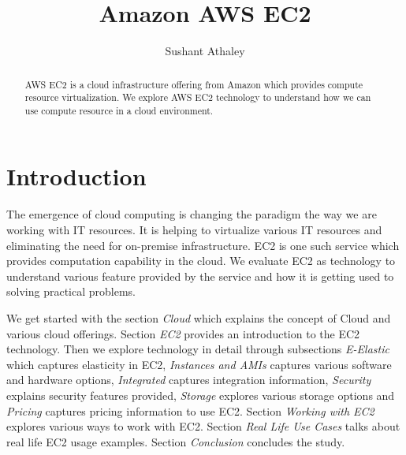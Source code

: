 
\title{Amazon AWS EC2}


\author{Sushant Athaley}

\renewcommand{\shortauthors}{G. v. Laszewski}


\begin{abstract}

AWS EC2 is a cloud infrastructure offering from Amazon which provides
compute resource virtualization. We explore AWS EC2 technology to
understand how we can use compute resource in a cloud environment.

\end{abstract}


\maketitle

\section{Introduction}

The emergence of cloud computing is changing the paradigm the way we
are working with IT resources. It is helping to virtualize various IT
resources and eliminating the need for on-premise infrastructure. EC2
is one such service which provides computation capability in the
cloud. We evaluate EC2 as technology to understand various feature
provided by the service and how it is getting used to solving
practical problems.

We get started with the section \emph{Cloud} which explains the
concept of Cloud and various cloud offerings. Section \emph{EC2}
provides an introduction to the EC2 technology. Then we explore
technology in detail through subsections \emph{E-Elastic} which
captures elasticity in EC2, \emph{Instances and AMIs} captures various
software and hardware options, \emph{Integrated} captures integration
information, \emph{Security} explains security features
provided, \emph{Storage} explores various storage options
and \emph{Pricing} captures pricing information to use EC2.
Section \emph{Working with EC2} explores various ways to work with
EC2. Section \emph{Real Life Use Cases} talks about real life EC2
usage examples. Section \emph{Conclusion} concludes the study.

